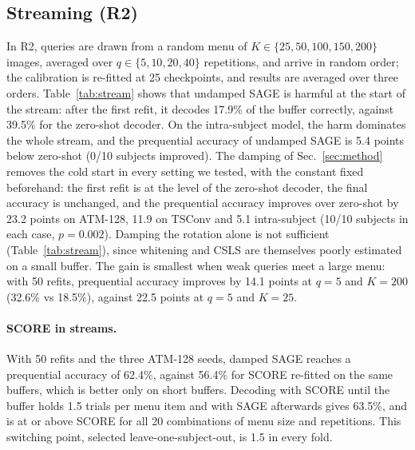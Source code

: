 \documentclass[10pt,twocolumn,letterpaper]{article}
\begin{document}
\subsection{Streaming (R2)}
\label{sec:stream}

In R2, queries are drawn from a random menu of $K \in \{25, 50, 100, 150, 200\}$ images, averaged over $q \in \{5, 10, 20, 40\}$ repetitions, and arrive in random order; the calibration is re-fitted at 25 checkpoints, and results are averaged over three orders. Table~\ref{tab:stream} shows that undamped SAGE is harmful at the start of the stream: after the first refit, it decodes 17.9\% of the buffer correctly, against 39.5\% for the zero-shot decoder. On the intra-subject model, the harm dominates the whole stream, and the prequential accuracy of undamped SAGE is 5.4 points below zero-shot (0/10 subjects improved). The damping of Sec.~\ref{sec:method} removes the cold start in every setting we tested, with the constant fixed beforehand: the first refit is at the level of the zero-shot decoder, the final accuracy is unchanged, and the prequential accuracy improves over zero-shot by 23.2 points on ATM-128, 11.9 on TSConv and 5.1 intra-subject (10/10 subjects in each case, $p=0.002$). Damping the rotation alone is not sufficient (Table~\ref{tab:stream}), since whitening and CSLS are themselves poorly estimated on a small buffer. The gain is smallest when weak queries meet a large menu: with 50 refits, prequential accuracy improves by 14.1 points at $q=5$ and $K=200$ (32.6\% vs 18.5\%), against 22.5 points at $q=5$ and $K=25$.

\paragraph{SCORE in streams.}
With 50 refits and the three ATM-128 seeds, damped SAGE reaches a prequential accuracy of 62.4\%, against 56.4\% for SCORE re-fitted on the same buffers, which is better only on short buffers. Decoding with SCORE until the buffer holds 1.5 trials per menu item and with SAGE afterwards gives 63.5\%, and is at or above SCORE for all 20 combinations of menu size and repetitions. This switching point, selected leave-one-subject-out, is 1.5 in every fold.
\end{document}
